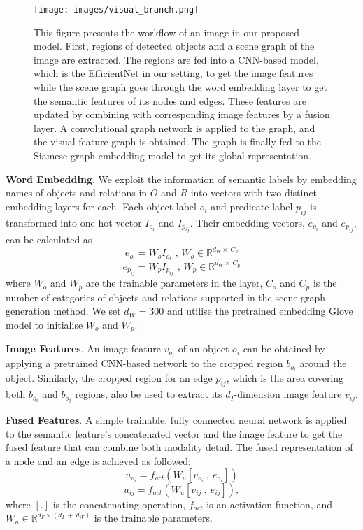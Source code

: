 \documentclass{IOS-Book-Article}
\begin{document}
\begin{figure}[h]
  \centering
  \texttt{[image: images/visual\_branch.png]}
  \caption{This figure presents the workflow of an image in our proposed model. First, regions of detected objects and a scene graph of the image are extracted. The regions are fed into a CNN-based model, which is the EfficientNet \cite{tan2019efficientnet} in our setting, to get the image features while the scene graph goes through the word embedding layer to get the semantic features of its nodes and edges. These features are updated by combining with corresponding image features by a fusion layer. A convolutional graph network is applied to the graph, and the visual feature graph is obtained. The graph is finally fed to the Siamese graph embedding model to get its global representation.}
  \label{fig:visual_branch}
\end{figure}

\textbf{Word Embedding}. We exploit the information of semantic labels by embedding names of objects and relations in $O$ and $R$ into vectors with two distinct embedding layers for each. Each object label $o_i$ and predicate label $p_{ij}$ is transformed into one-hot vector $I_{o_i}$ and $I_{p_{ij}}$.
Their embedding vectors, $e_{o_i}$ and $e_{p_{ij}}$, can be calculated as
\begin{equation}
e_{o_i}=W_oI_{o_i} \text{ ,  } W_o \in \mathbb{R}^{d_{W}\times\:C_o}
\end{equation}
\begin{equation}
e_{p_{ij}}=W_pI_{p_{ij}} \text{ ,  } W_p \in \mathbb{R}^{d_{W} \times\: C_p}
\end{equation}
where $W_o$ and $W_p$ are the trainable parameters in the layer, $C_o$ and $C_p$ is the number of categories of objects and relations supported in the scene graph generation method.
We set $d_{W}=300$ and utilise the pretrained embedding Glove model to initialise $W_o$ and $W_p$. 

\textbf{Image Features}. An image feature $v_{o_i}$ of an object $o_i$ can be obtained by applying a pretrained CNN-based network to the cropped region $b_{o_i}$ around the object. Similarly, the cropped region for an edge $p_{ij}$, which is the area covering both $b_{o_i}$ and $b_{o_j}$ regions, also be used to extract its $d_{I}$-dimension image feature $v_{ij}$.

\textbf{Fused Features}. A simple trainable, fully connected neural network is applied to the semantic feature's concatenated vector and the image feature to get the fused feature that can combine both modality detail. The fused representation of a node and an edge is achieved as followed:
\begin{equation}
u_{o_i} = f_{act}(W_u[v_{o_i}\:,\:e_{o_i}])
\label{eq:u_o}
\end{equation}
\begin{equation}
u_{ij} = f_{act}(W_u[v_{ij}\:,\:e_{ij}]),
\label{eq:u_p}
\end{equation}
where $[.]$ is the concatenating operation, $f_{act}$ is an activation function, and $W_u \in \mathbb{R}^{d_{F} \times (d_I \: + \: d_W)}$ is the trainable parameters.
\end{document}
